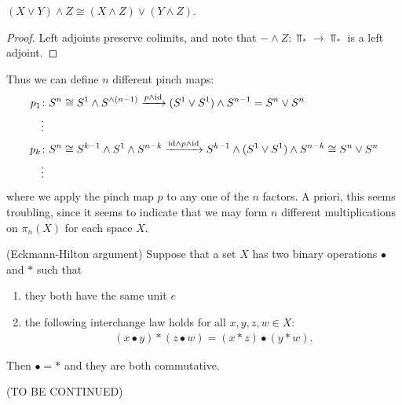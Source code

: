 \documentclass{article}[11pt]
\newcommand{\smashprod}{\wedge} %
\renewcommand{\dot}{\bullet }
\begin{document}
	\begin{exercise} $(X\vee Y)\smashprod Z \cong (X\smashprod Z)\vee (Y\smashprod Z)$.
	\end{exercise}
	\begin{proof} Left adjoints preserve colimits, and note that $-\smashprod Z \colon\Top_\ast \to \Top_\ast$ is a left adjoint.
	\end{proof}

	Thus we can define $n$ different pinch maps:
	\begin{align*}
		p_1 &\colon S^n \cong S^1 \smashprod S^{\smashprod (n-1)} \xto {p\smashprod \id} (S^1 \vee S^1)\smashprod S^{n-1} = S^n \vee S^n \\
		&\vdots \\
		p_k &\colon S^n \cong S^{k-1}\smashprod S^1 \smashprod S^{n-k} \xto{\id\smashprod p \smashprod \id} S^{k-1}\smashprod (S^1 \vee S^1)\smashprod S^{n-k} \cong S^n \vee S^n \\
		&\vdots
	\end{align*}
	where we apply the pinch map $p$ to any one of the $n$ factors. A priori, this seems troubling, since it seems to indicate that we may form $n$ different multiplications on $\pi_n(X)$ for each space $X$.

	\begin{lemma} (Eckmann-Hilton argument) Suppose that a set $X$ has two binary operations $\dot$ and $\ast$ such that
	\begin{enumerate}
		\item they both have the same unit $e$
		\item the following interchange law holds for all $x,y,z,w \in X$:
		\begin{align*}
			(x\dot y)\ast(z\dot w) = (x\ast z)\dot (y\ast w).
		\end{align*}
	\end{enumerate}
	Then $\dot = \ast$ and they are both commutative.
	\end{lemma}
	
	(TO BE  CONTINUED)
	
\end{document}
